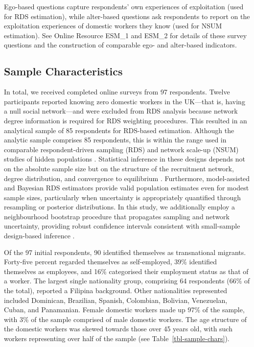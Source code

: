 \documentclass[
  12pt,
  letterpaper,
  DIV=11,
  numbers=noendperiod]{scrartcl}
\begin{document}
Ego-based questions capture respondents' own experiences of exploitation
(used for RDS estimation), while alter-based questions ask respondents
to report on the exploitation experiences of domestic workers they know
(used for NSUM estimation). See Online Resource ESM\_1 and ESM\_2 for
details of these survey questions and the construction of comparable
ego- and alter-based indicators.

\subsection{Sample Characteristics}\label{sec-sample-characteristics}

In total, we received completed online surveys from 97 respondents.
Twelve participants reported knowing zero domestic workers in the
UK---that is, having a null social network---and were excluded from RDS
analysis because network degree information is required for RDS
weighting procedures. This resulted in an analytical sample of 85
respondents for RDS-based estimation. Although the analytic sample
comprises 85 respondents, this is within the range used in comparable
respondent-driven sampling (RDS) and network scale-up (NSUM) studies of
hidden populations
\autocite{gile10-respondentdriven,goel10-assessing,gile11-improved}.
Statistical inference in these designs depends not on the absolute
sample size but on the structure of the recruitment network, degree
distribution, and convergence to equilibrium \autocite{salg04-sampling}.
Furthermore, model-assisted and Bayesian RDS estimators
\autocite{gile11-improved,gile18-methods} provide valid population
estimates even for modest sample sizes, particularly when uncertainty is
appropriately quantified through resampling or posterior distributions.
In this study, we additionally employ a neighbourhood bootstrap
procedure that propagates sampling and network uncertainty, providing
robust confidence intervals consistent with small-sample design-based
inference \autocite{hand14-estimating}.

Of the 97 initial respondents, 90 identified themselves as transnational
migrants. Forty-five percent regarded themselves as self-employed, 39\%
identified themselves as employees, and 16\% categorised their
employment status as that of a worker. The largest single nationality
group, comprising 64 respondents (66\% of the total), reported a
Filipina background. Other nationalities represented included Dominican,
Brazilian, Spanish, Colombian, Bolivian, Venezuelan, Cuban, and
Panamanian. Female domestic workers made up 97\% of the sample, with 3\%
of the sample comprised of male domestic workers. The age structure of
the domestic workers was skewed towards those over 45 years old, with
such workers representing over half of the sample (see
Table~\ref{tbl-sample-chars}).
\end{document}

